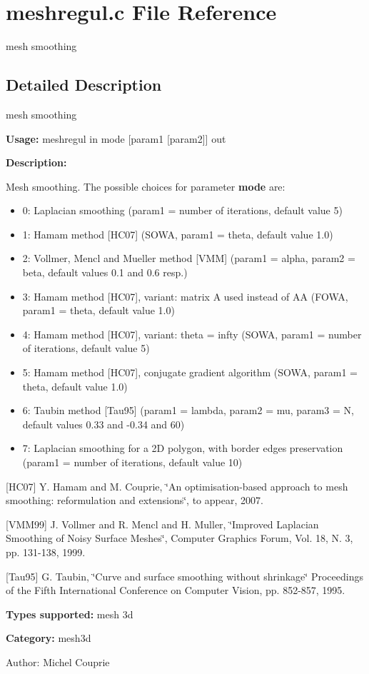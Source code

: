 \section{meshregul.c File Reference}
\label{meshregul_8c}
mesh smoothing  




\label{_details}
\subsection{Detailed Description}
mesh smoothing 

{\bf Usage:} meshregul in mode [param1 [param2]] out

{\bf Description:}

Mesh smoothing. The possible choices for parameter {\bf mode} are: \begin{itemize}
\item 0: Laplacian smoothing (param1 = number of iterations, default value 5) \item 1: Hamam method [HC07] (SOWA, param1 = theta, default value 1.0) \item 2: Vollmer, Mencl and Mueller method [VMM] (param1 = alpha, param2 = beta, default values 0.1 and 0.6 resp.) \item 3: Hamam method [HC07], variant: matrix A used instead of AA (FOWA, param1 = theta, default value 1.0) \item 4: Hamam method [HC07], variant: theta = infty (SOWA, param1 = number of iterations, default value 5) \item 5: Hamam method [HC07], conjugate gradient algorithm (SOWA, param1 = theta, default value 1.0) \item 6: Taubin method [Tau95] (param1 = lambda, param2 = mu, param3 = N, default values 0.33 and -0.34 and 60) \item 7: Laplacian smoothing for a 2D polygon, with border edges preservation (param1 = number of iterations, default value 10)\end{itemize}
[HC07] Y. Hamam and M. Couprie, \char`\"{}An optimisation-based approach to mesh smoothing: reformulation and extensions\char`\"{}, to appear, 2007.

[VMM99] J. Vollmer and R. Mencl and H. Muller, \char`\"{}Improved Laplacian Smoothing of Noisy Surface Meshes\char`\"{}, Computer Graphics Forum, Vol. 18, N. 3, pp. 131-138, 1999.

[Tau95] G. Taubin, \char`\"{}Curve and surface smoothing without shrinkage\char`\"{} Proceedings of the Fifth International Conference on Computer Vision, pp. 852-857, 1995.

{\bf Types supported:} mesh 3d

{\bf Category:} mesh3d

\begin{Desc}
\item[Author:]Michel Couprie \end{Desc}
